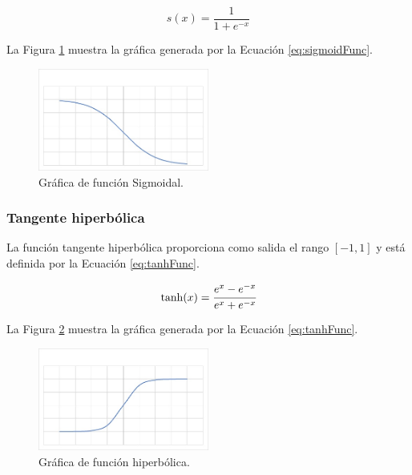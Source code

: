 \begin{equation}
\label{eq:sigmoidFunc}
    s(x)={\frac {1}{1+e^{-x}}}
\end{equation}

La Figura \ref{fig:graficaSigmoidal} muestra la gráfica generada por la Ecuación \ref{eq:sigmoidFunc}.

\begin{figure}[H]
    \centering
    \includegraphics[width=0.5\textwidth]{MarcoTeorico/imgs/GraficaSigmoidal.jpg}
    \caption{Gráfica de función Sigmoidal.}
    \label{fig:graficaSigmoidal}
\end{figure}

\subsubsection{Tangente hiperbólica}

La función tangente hiperbólica proporciona como salida el rango $[-1,1]$ y está definida por la Ecuación \ref{eq:tanhFunc}.

\begin{equation}
\label{eq:tanhFunc}
    \tanh (x)={\cfrac {e^{x}-e^{-x}}{e^{x}+e^{-x}}}
\end{equation}

La Figura \ref{fig:graficaHiperbolica} muestra la gráfica generada por la Ecuación \ref{eq:tanhFunc}.

\begin{figure}[H]
    \centering
    \includegraphics[width=0.5\textwidth]{MarcoTeorico/imgs/GraficaHiperbolica.jpg}
    \caption{Gráfica de función hiperbólica.}
    \label{fig:graficaHiperbolica}
\end{figure}


